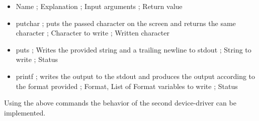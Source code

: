 \begin{itemize}
\tightlist
\item
  Name ; Explanation ; Input arguments ; Return value
\item
  putchar ; puts the passed character on the screen and returns the same
  character ; Character to write ; Written character
\item
  puts ; Writes the provided string and a trailing newline to stdout ;
  String to write ; Status
\item
  printf ; writes the output to the stdout and produces the output
  according to the format provided ; Format, List of Format variables to
  write ; Status
\end{itemize}

Using the above commands the behavior of the second device-driver can be
implemented.
